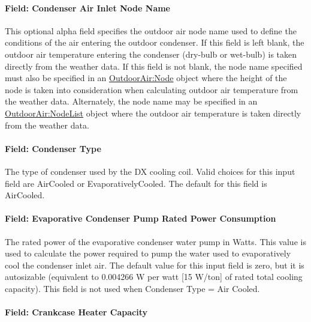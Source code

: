 \paragraph{Field: Condenser Air Inlet Node Name}\label{field-condenser-air-inlet-node-name-3}

This optional alpha field specifies the outdoor air node name used to define the conditions of the air entering the outdoor condenser. If this field is left blank, the outdoor air temperature entering the condenser (dry-bulb or wet-bulb) is taken directly from the weather data. If this field is not blank, the node name specified must also be specified in an \hyperref[outdoorairnode]{OutdoorAir:Node} object where the height of the node is taken into consideration when calculating outdoor air temperature from the weather data. Alternately, the node name may be specified in an \hyperref[outdoorairnodelist]{OutdoorAir:NodeList} object where the outdoor air temperature is taken directly from the weather data.

\paragraph{Field: Condenser Type}\label{field-condenser-type-3}

The type of condenser used by the DX cooling coil. Valid choices for this input field are AirCooled or EvaporativelyCooled. The default for this field is AirCooled.

\paragraph{Field: Evaporative Condenser Pump Rated Power Consumption}\label{field-evaporative-condenser-pump-rated-power-consumption-1}

The rated power of the evaporative condenser water pump in Watts. This value is used to calculate the power required to pump the water used to evaporatively cool the condenser inlet air. The default value for this input field is zero, but it is autosizable (equivalent to 0.004266 W per watt {[}15 W/ton{]} of rated total cooling capacity). This field is not used when Condenser Type = Air Cooled.

\paragraph{Field: Crankcase Heater Capacity}\label{field-crankcase-heater-capacity-3}

